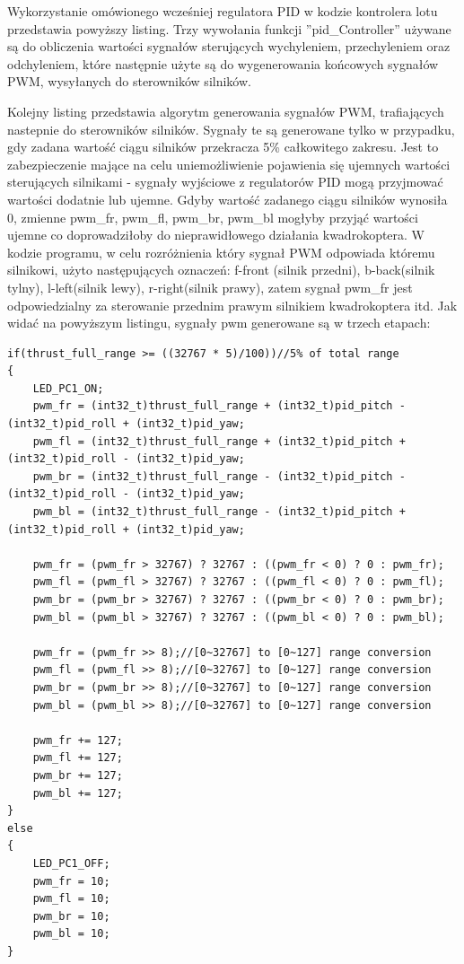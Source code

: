 Wykorzystanie omówionego wcześniej regulatora PID w kodzie kontrolera lotu przedstawia powyższy listing. Trzy wywołania funkcji ''pid\_Controller'' używane są do obliczenia wartości sygnałów sterujących wychyleniem, przechyleniem oraz odchyleniem, które następnie użyte są do wygenerowania końcowych sygnałów PWM, wysyłanych do sterowników silników. 


Kolejny listing przedstawia algorytm generowania sygnałów PWM, trafiających nastepnie do sterowników silników. Sygnały te są generowane tylko w przypadku, gdy zadana wartość ciągu silników przekracza 5\% całkowitego zakresu. Jest to zabezpieczenie mające na celu uniemożliwienie pojawienia się ujemnych wartości sterujących silnikami - sygnały wyjściowe z regulatorów PID mogą przyjmować wartości dodatnie lub ujemne. Gdyby wartość zadanego ciągu silników wynosiła 0, zmienne pwm\_fr, pwm\_fl, pwm\_br, pwm\_bl mogłyby przyjąć wartości ujemne co doprowadziłoby do nieprawidłowego działania kwadrokoptera. W kodzie programu, w celu rozróżnienia który sygnał PWM odpowiada któremu silnikowi, użyto następujących oznaczeń: f-front (silnik przedni), b-back(silnik tylny), l-left(silnik lewy), r-right(silnik prawy), zatem sygnał pwm\_fr jest odpowiedzialny za sterowanie przednim prawym silnikiem kwadrokoptera itd. Jak widać na powyższym listingu, sygnały pwm generowane są w trzech etapach:

\begin{lstlisting}
if(thrust_full_range >= ((32767 * 5)/100))//5% of total range
{
	LED_PC1_ON;
	pwm_fr = (int32_t)thrust_full_range + (int32_t)pid_pitch - (int32_t)pid_roll + (int32_t)pid_yaw;
	pwm_fl = (int32_t)thrust_full_range + (int32_t)pid_pitch + (int32_t)pid_roll - (int32_t)pid_yaw;
	pwm_br = (int32_t)thrust_full_range - (int32_t)pid_pitch - (int32_t)pid_roll - (int32_t)pid_yaw;
	pwm_bl = (int32_t)thrust_full_range - (int32_t)pid_pitch + (int32_t)pid_roll + (int32_t)pid_yaw;

	pwm_fr = (pwm_fr > 32767) ? 32767 : ((pwm_fr < 0) ? 0 : pwm_fr); 
	pwm_fl = (pwm_fl > 32767) ? 32767 : ((pwm_fl < 0) ? 0 : pwm_fl); 
	pwm_br = (pwm_br > 32767) ? 32767 : ((pwm_br < 0) ? 0 : pwm_br);
	pwm_bl = (pwm_bl > 32767) ? 32767 : ((pwm_bl < 0) ? 0 : pwm_bl);

	pwm_fr = (pwm_fr >> 8);//[0~32767] to [0~127] range conversion
	pwm_fl = (pwm_fl >> 8);//[0~32767] to [0~127] range conversion
	pwm_br = (pwm_br >> 8);//[0~32767] to [0~127] range conversion
	pwm_bl = (pwm_bl >> 8);//[0~32767] to [0~127] range conversion

	pwm_fr += 127;
	pwm_fl += 127;
	pwm_br += 127;
	pwm_bl += 127;
}
else
{
	LED_PC1_OFF;
	pwm_fr = 10;
	pwm_fl = 10;
	pwm_br = 10;
	pwm_bl = 10;
}
\end{lstlisting}


